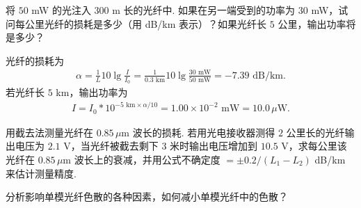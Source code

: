 \documentclass{assignment}
\begin{document}
\begin{prob}
    将 $50$ mW 的光注入 $300$ m 长的光纤中. 如果在另一端受到的功率为 $30$ mW，试问每公里光纤的损耗是多少（用 dB/km 表示）？如果光纤长 $5$ 公里，输出功率将是多少？
\end{prob}
\begin{sol}
    光纤的损耗为
    \begin{align}
        \alpha=\frac{1}{L}10\lg\frac{I}{I_0}=\frac{1}{0.3\text{ km}}10\lg\frac{30\text{ mW}}{50\text{ mW}}=-7.39\text{ dB/km}.
    \end{align}
    若光纤长 $5$ km，输出功率为
    \begin{align}
        I=I_0*10^{-5\text{ km}\times\alpha/10}=1.00\times 10^{-2}\text{ mW}=10.0\,\mu\text{W}.
    \end{align}
\end{sol}

\begin{prob}
    用截去法测量光纤在 $0.85\,\mu$m 波长的损耗. 若用光电接收器测得 $2$ 公里长的光纤输出电压为 $2.1$ V，当光纤被截去剩下 $3$ 米时输出电压增加到 $10.5$ V，求每公里该光纤在 $0.85\,\mu$m 波长上的衰减，并用公式不确定度 $=\pm 0.2/(L_1-L_2)$ dB/km 来估计测量精度.
\end{prob}
\begin{sol}
    
\end{sol}

\begin{prob}
    分析影响单模光纤色散的各种因素，如何减小单模光纤中的色散？
\end{prob}
\begin{ans}
    
\end{ans}
\end{document}
